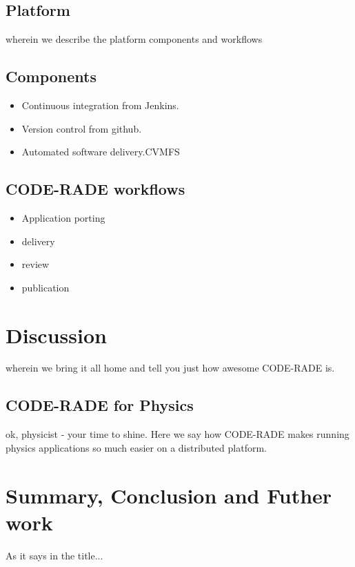 \documentclass[a4paper]{jpconf}
\begin{document}
\subsection{Platform}

wherein we describe the platform components and workflows

\subsection{Components}

\begin{itemize}
	\item Continuous integration from Jenkins.
    \item Version control from github.
    \item Automated software delivery.CVMFS
\end{itemize}

\subsection{CODE-RADE workflows}

\begin{itemize}
	\item Application porting
   \item delivery
   \item review
   \item publication
\end{itemize}

\section{Discussion}

wherein we bring it all home and tell you just how awesome CODE-RADE is.

\subsection{CODE-RADE for Physics}

ok, physicist - your time to shine. Here we say how CODE-RADE makes running physics applications so much easier on a distributed platform.

\section{Summary, Conclusion and Futher work}

As it says in the title...
\end{document}
